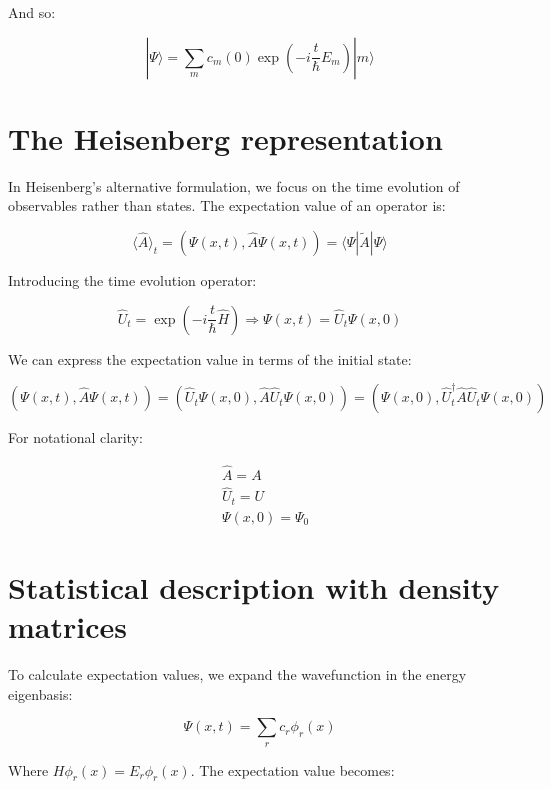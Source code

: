 And so:

\begin{equation}
|\Psi\rangle=\sum_{m} c_{m}(0) \exp \left(-i \frac{t}{\hbar} E_{m}\right)|m\rangle
\end{equation}

\section{The Heisenberg representation}
In Heisenberg's alternative formulation, we focus on the time evolution of observables rather than states. The expectation value of an operator is:

\begin{equation}
\langle\hat{A}\rangle_{t}=(\Psi(x, t), \hat{A} \Psi(x, t))=\langle\Psi| \tilde{A}|\Psi\rangle
\end{equation}

Introducing the time evolution operator:

\begin{equation}
\hat{U}_{t}=\exp \left(-i \frac{t}{\hbar} \hat{H}\right) \Longrightarrow \Psi(x, t)=\hat{U}_{t} \Psi(x, 0)
\end{equation}

We can express the expectation value in terms of the initial state:

\begin{equation}
(\Psi(x, t), \hat{A} \Psi(x, t))=\left(\hat{U}_{t} \Psi(x, 0), \hat{A} \hat{U}_{t} \Psi(x, 0)\right)=\left(\Psi(x, 0), \hat{U}_{t}^{\dagger} \hat{A} \hat{U}_{t} \Psi(x, 0)\right)
\end{equation}

For notational clarity:

\begin{align}
& \hat{A}=A \\
& \hat{U}_{t}=U  \\
& \Psi(x, 0)=\Psi_{0}
\end{align}

\section{Statistical description with density matrices}
To calculate expectation values, we expand the wavefunction in the energy eigenbasis:

\begin{equation}
\Psi(x, t)=\sum_{r} c_{r} \phi_{r}(x)
\end{equation}

Where $H \phi_{r}(x)=E_{r} \phi_{r}(x)$. The expectation value becomes:

